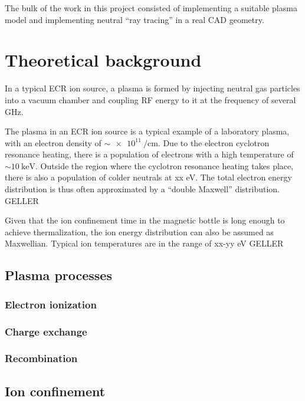 \documentclass[a4paper,twoside,12pt]{article}
\begin{document}
The bulk of the work in this project consisted of implementing a suitable plasma model and implementing neutral ``ray tracing'' in a real CAD geometry.

\section{Theoretical background}
In a typical ECR ion source, a plasma is formed by injecting neutral gas particles into a vacuum chamber and coupling RF energy to it at the frequency of several $\si{\giga\hertz}$.

The plasma in an ECR ion source is a typical example of a laboratory plasma, with an electron density of $\sim\SI{e11}{\per\centi\metre}$. Due to the electron cyclotron resonance heating, there is a population of electrons with a high temperature of $\sim\SI{10}{\kilo\electronvolt}$. Outside the region where the cyclotron resonance heating takes place, there is also a population of colder neutrals at xx eV. The total electron energy distribution is thus often approximated by a ``double Maxwell'' distribution. GELLER

Given that the ion confinement time in the magnetic bottle is long enough to achieve thermalization, the ion energy distribution can also be assumed as Maxwellian. Typical ion temperatures are in the range of xx-yy eV GELLER

\subsection{Plasma processes}

\subsubsection{Electron ionization}

\subsubsection{Charge exchange}

\subsubsection{Recombination}

\subsection{Ion confinement}
\end{document}
